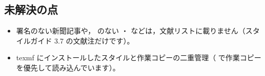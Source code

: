 \subsection{未解決の点}
\begin{itemize}
\item 署名のない新聞記事や， のない ・ などは，文献リストに載りません（スタイルガイド 3.7 の文献注だけです）。
\item texmf にインストールしたスタイルと作業コピーの二重管理（ で作業コピーを優先して読み込んでいます）。
\end{itemize}
